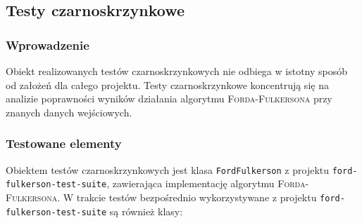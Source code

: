 \subsection{Testy czarno\dywiz skrzynkowe}

\subsubsection{Wprowadzenie}
Obiekt realizowanych testów czarno\dywiz skrzynkowych nie odbiega w istotny sposób od założeń dla całego projektu. Testy czarno\dywiz skrzynkowe koncentrują się na analizie poprawności wyników działania algorytmu \textsc{Forda-Fulkersona} przy znanych danych wejściowych. %

\subsubsection{Testowane elementy}
Obiektem testów czarnoskrzynkowych jest klasa \texttt{FordFulkerson} z projektu \texttt{ford-fulkerson-test-suite}, zawierająca implementację algorytmu \textsc{Forda-Fulkersona}. W trakcie testów bezpośrednio wykorzystywane z projektu \texttt{ford-fulkerson-test-suite} są również klasy:
\begin{itemize}[nosep]
    
    
\end{itemize}

